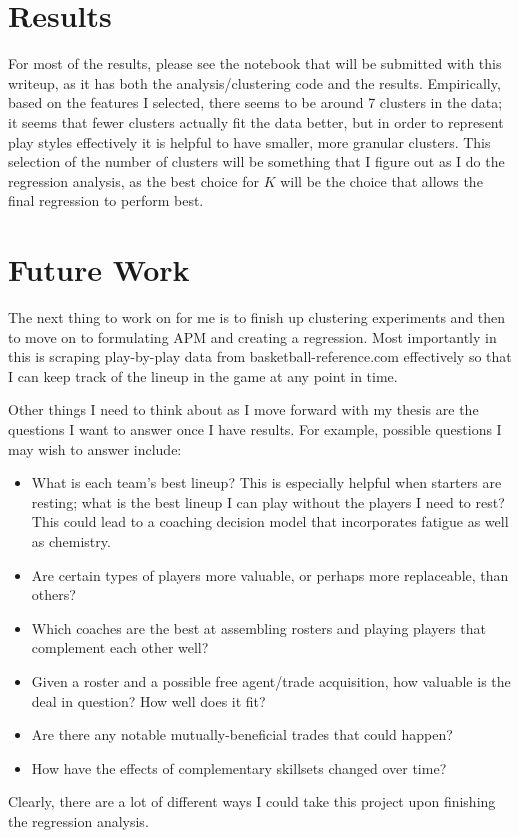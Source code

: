 \documentclass[12pt]{article}
\begin{document}
\section{Results} \label{results}

For most of the results, please see the notebook that will be submitted with
this writeup, as it has both the analysis/clustering code and the results.
Empirically, based on the features I selected, there seems to be around 7
clusters in the data; it seems that fewer clusters actually fit the data
better, but in order to represent play styles effectively it is helpful to have
smaller, more granular clusters. This selection of the number of clusters will
be something that I figure out as I do the regression analysis, as the best
choice for $K$ will be the choice that allows the final regression to perform
best.

\section{Future Work} \label{future}

The next thing to work on for me is to finish up clustering experiments and
then to move on to formulating APM and creating a regression. Most importantly in this is scraping play-by-play data from basketball-reference.com effectively so that I can keep track of the lineup in the game at any point in time.

Other things I need to think about as I move forward with my thesis are the questions I want to answer once I have results. For example, possible questions I may wish to answer include:
\begin{itemize}
		\item What is each team's best lineup? This is especially helpful when
			starters are resting; what is the best lineup I can play without the
			players I need to rest? This could lead to a coaching decision model that
			incorporates fatigue as well as chemistry.
		\item Are certain types of players more valuable, or perhaps more
		replaceable, than others?
		\item Which coaches are the best at assembling rosters and playing players
			that complement each other well?
		\item Given a roster and a possible free agent/trade acquisition, how
			valuable is the deal in question? How well does it fit?
		\item Are there any notable mutually-beneficial trades that could happen?
		\item How have the effects of complementary skillsets changed over time?
\end{itemize}

Clearly, there are a lot of different ways I could take this project upon finishing the regression analysis.



\end{document}
